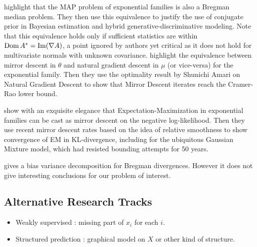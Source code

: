 \documentclass{article}
\newcommand{\logpart}{A}
\newcommand{\conj}{\logpart^*}
\newcommand{\natp}{\theta}
\newcommand{\meanp}{\mu}
\renewcommand\appendix{\end{document}}
\begin{document}
\citet{agarwal2010geometric} highlight that the MAP problem of exponential families is also a Bregman median problem. They then use this equivalence to justify the use of conjugate prior in Bayesian estimation and hybrid generative-discriminative modeling.
Note that this equivalence holds only if sufficient statistics are within $\dom \conj  = \mathrm{Im} (\nabla\logpart)$, a point ignored by authors yet critical as it does not hold for multivariate normals with unknown covariance. 
\citet{raskutti2015information} highlight the equivalence between mirror descent in $\natp$ and natural gradient descent in $\meanp$ (or vice-versa) for the exponential family. Then they use the optimality result by Shunichi Amari on Natural Gradient Descent to show that Mirror Descent iterates reach the Cramer-Rao lower bound.

\citet{kunstner2020homeomorphic} show with an exquisite elegance that Expectation-Maximization in exponential families can be cast as mirror descent on the negative log-likelihood. Then they use recent mirror descent rates based on the idea of relative smoothness \citep{birnbaum2011distributed, bauschke2017descent, lu2018relatively} to show convergence of EM in KL-divergence, including for the ubiquitous Gaussian Mixture model, which had resisted bounding attempts for 50 years.

\citet{pfau2013generalized} gives a bias variance decomposition for Bregman divergences. However it does not give interesting conclusions for our problem of interest.

\subsection{Alternative Research Tracks}
\begin{itemize}
	\item Weakly supervised : missing part of $x_i$ for each $i$.
	\item Structured prediction : graphical model on $X$ or other kind of structure.
\end{itemize}






\newpage
\appendix
\end{document}
